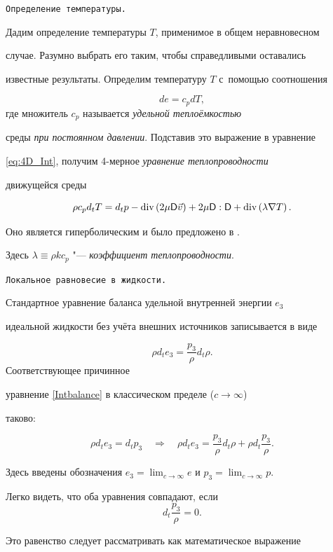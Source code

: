 \smallskip



{\tt Определение температуры.}

Дадим определение температуры $T$, применимое в общем неравновесном

случае. Разумно выбрать его таким, чтобы справедливыми оставались

известные результаты. Определим температуру $T$ с~помощью соотношения

$$de=c_{p}dT,$$ где множитель $c_{p}$ называется \emph{удельной теплоёмкостью}

среды \emph{при постоянном давлении}. Подставив это выражение в уравнение

\eqref{eq:4D_Int}, получим 4-мерное \emph{уравнение теплопроводности}

движущейся среды

\[

\rho c_{p}d_{t}T=d_{t}p-\textnormal{div}\left(2\mu\mathsf{D}\vec{v}\right)+2\mu\mathsf{D}:\mathsf{D}+\textnormal{div}\left(\lambda\nabla T\right).

\]

Оно является гиперболическим и было предложено в \cite{Belevich04}.

Здесь $\lambda\equiv\rho kc_{p}$ "---  \emph{коэффициент теплопроводности}. 



\smallskip



{\tt Локальное равновесие в жидкости.}

Стандартное уравнение баланса удельной внутренней энергии $e_{3}$

идеальной жидкости без учёта внешних источников записывается в виде

$$\rho d_{t}e_{3}=\frac{p_{3}}{\rho}d_{t}\rho.$$ Соответствующее причинное

уравнение \eqref{Intbalance} в классическом пределе ($c\to\infty$)

таково:

\[

\rho d_{t}e_{3}=d_{t}p_{3}\quad\Rightarrow\quad\rho d_{t}e_{3}=\frac{p_{3}}{\rho}d_{t}\rho+\rho d_{t}\frac{p_{3}}{\rho}.

\]

Здесь введены обозначения $e_{3}=\lim_{c\to\infty}e$ и $p_{3}=\lim_{c\to\infty}p$.

Легко видеть, что оба уравнения совпадают, если $$d_{t}\frac{p_{3}}{\rho}=0.$$

Это равенство следует рассматривать как математическое выражение

